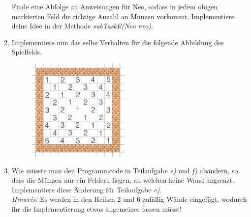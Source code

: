 \begin{enumerate}[label=\alph*)]
\begin{figure}[h!]
    \end{figure}\newline
    Finde eine Abfolge an Anweisungen für Neo, sodass in jedem obigen markierten Feld die richtige Anzahl an Münzen vorkommt. Implementiere deine Idee
    in der Methode \textit{subTaskE(Neo neo)}.
    \newpage
    \item Implementiere nun das selbe Verhalten für die folgende Abbildung des Spielfelds.\\
    \begin{figure}[h!]
        \centering
        \includegraphics[height=5cm]{figures/ex05f1.png}
    \end{figure}\newline
    \item Wie müsste man den Programmcode in Teilaufgabe \textit{e)} und \textit{f)} abändern, so dass die Münzen nur ein Feldern liegen, an welchen 
    keine Wand angrenzt. Implementiere diese Änderung für Teilaufgabe \textit{e)}.\\
    \textit{Hinweis:} Es werden in den Reihen 2 und 6 zufällig Wände eingefügt, wodurch ihr die Implementierung etwas allgemeiner fassen müsst!
\end{enumerate}